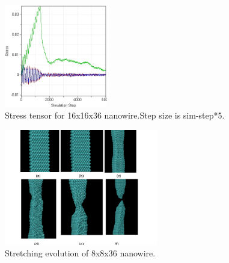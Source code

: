 \documentclass[11pt,twocolumn]{report}
\begin{document}
        \begin{figure}
            \label{fig:rawdata-large}
            \centering
            \includegraphics[width=0.4\textwidth]{StressvsSimulationStep-large.jpg}
            \caption{Stress tensor for 16x16x36 nanowire.Step size is sim-step*5.}
        \end{figure}
        \begin{figure}
            \label{fig:evolution}
            \centering
            \includegraphics[width=0.6\textwidth]{evolution.png}
            \caption{Stretching evolution of 8x8x36 nanowire.}
        \end{figure}
\end{document}
